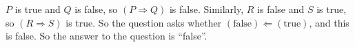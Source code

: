 $P$ is true and $Q$ is false, so $(P\Rightarrow Q)$ is false. Similarly, $R$ is false and $S$ is true, so $(R\Rightarrow S)$ is true. So the question asks whether $(\mbox{false})\Leftarrow(\mbox{true})$, and this is false. So the answer to the question is ``false''.
